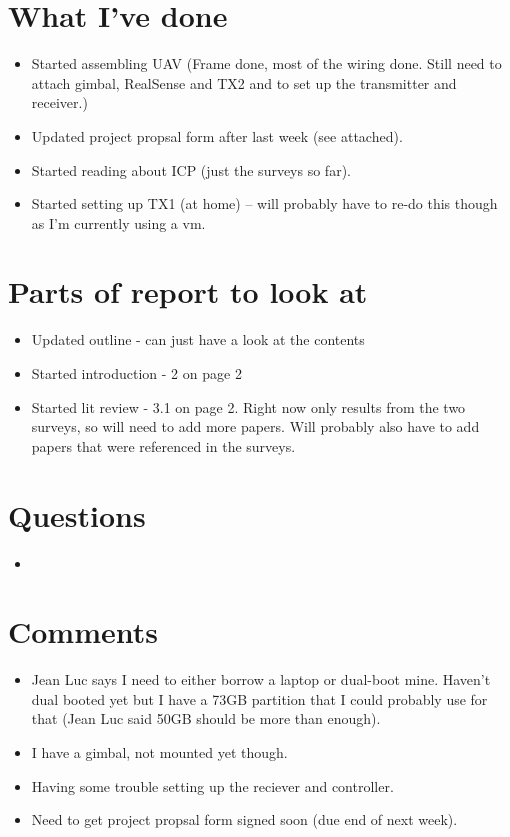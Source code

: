 \documentclass[12pt,a4paper]{article}
\begin{document}
\author{Katrina Ashton}


\pagestyle{fancy}
\fancyhf{}
\rhead{\thepage}

\section{What I've done}
\begin{itemize}
\item{Started assembling UAV (Frame done, most of the wiring done. Still need to attach gimbal, RealSense and TX2 and to set up the transmitter and receiver.)}
\item{Updated project propsal form after last week (see attached).}
\item{Started reading about ICP (just the surveys so far).}
\item{Started setting up TX1 (at home) -- will probably have to re-do this though as I'm currently using a vm.}
\end{itemize}

\section{Parts of report to look at}
\begin{itemize}
\item{Updated outline - can just have a look at the contents}
\item{Started introduction - 2 on page 2}
\item{Started lit review - 3.1 on page 2. Right now only results from the two surveys, so will need to add more papers. Will probably also have to add papers that were referenced in the surveys.}
\end{itemize}

\section{Questions}
\begin{itemize}
\item
\end{itemize}

\section{Comments}
\begin{itemize}
\item{Jean Luc says I need to either borrow a laptop or dual-boot mine. Haven't dual booted yet but I have a 73GB partition that I could probably use for that (Jean Luc said 50GB should be more than enough).}
\item{I have a gimbal, not mounted yet though.}
\item{Having some trouble setting up the reciever and controller.}
\item{Need to get project propsal form signed soon (due end of next week).}
\end{itemize}
\end{document}
